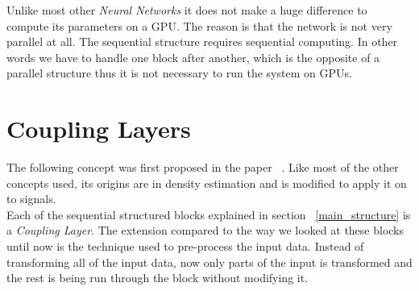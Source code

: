 \documentclass[oneside]{msvreport}%
\newcommand{\e}[1]{\emph{#1}}
\begin{document}
\noindent Unlike most other \e{Neural Networks} it does not make a huge difference to compute its parameters on a GPU. The reason is that the network is not very parallel at all. The sequential structure requires sequential computing. In other words we have to handle one block after another, which is the opposite of a parallel structure thus it is not necessary to run the system on GPUs.

\section{Coupling Layers}
The following concept was first proposed in the paper ~\cite{ardizzone2018analyzing}. Like most of the other concepts used, its origins are in density estimation and is modified to apply it on to signals. \\
Each of the sequential structured blocks explained in section ~\ref{main_structure} is a \e{Coupling Layer}. The extension compared to the way we looked at these blocks until now is the technique used to pre-process the input data. Instead of transforming all of the input data, now only parts of the input is transformed and the rest is being run through the block without modifying it.
\end{document}
